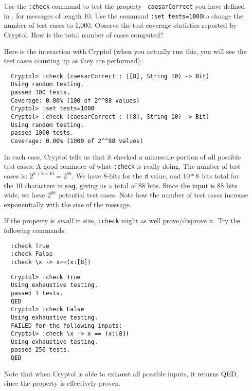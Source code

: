 \begin{Exercise}\label{ex:quick:0}
  Use the {\tt :check} command to test the property {\tt
    caesarCorrect} you have defined in
  , for messages of length
  10.  Use the command {\tt :set tests=1000}\indQCCount to change the
  number of test cases to 1,000.  Observe the test coverage statistics
  reported by Cryptol. How is the total number of cases computed?
\end{Exercise}
\begin{Answer}
  Here is the interaction with Cryptol (when you actually run this,
  you will see the test cases counting up as they are
  performed):\indQCCount
\begin{Verbatim}
  Cryptol> :check (caesarCorrect : ([8], String 10) -> Bit)
  Using random testing.
  passed 100 tests.
  Coverage: 0.00% (100 of 2^^88 values)
  Cryptol> :set tests=1000
  Cryptol> :check (caesarCorrect : ([8], String 10) -> Bit)
  Using random testing.
  passed 1000 tests.
  Coverage: 0.00% (1000 of 2^^88 values)
\end{Verbatim}
In each case, Cryptol tells us that it checked a minuscule portion of
all possible test cases: A good reminder of what {\tt :check} is
really doing.  The number of test cases is: $2^{8+8\times10} =
2^{88}$. We have 8-bits for the {\tt d} value, and $10*8$ bits total
for the 10 characters in {\tt msg}, giving us a total of 88
bits. Since the input is 88 bits wide, we have $2^{88}$ potential test
cases. Note how the number of test cases increase exponentially with
the size of the message.
\end{Answer}

\begin{Exercise}\label{ex:quick:1}
  If the property is \emph{small} in size, {\tt :check} might as well
  prove/disprove it. Try the following commands:
\begin{Verbatim}
  :check True
  :check False
  :check \x -> x==(x:[8])
\end{Verbatim}
\end{Exercise}
\begin{Answer}
\begin{Verbatim}
  Cryptol> :check True
  Using exhaustive testing.
  passed 1 tests.
  QED
  Cryptol> :check False
  Using exhaustive testing.
  FAILED for the following inputs:
  Cryptol> :check \x -> x == (x:[8])
  Using exhaustive testing.
  passed 256 tests.
  QED
\end{Verbatim}
Note that when Cryptol is able to exhaust all possible inputs, it returns QED, since the property is effectively proven.
\end{Answer}

